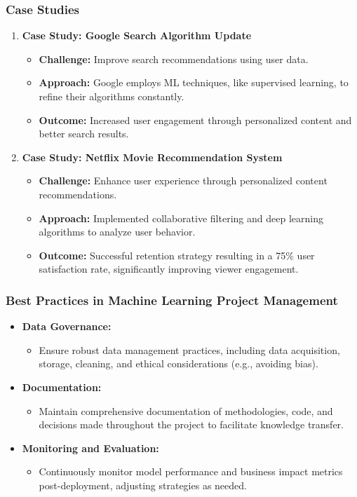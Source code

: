 \documentclass[aspectratio=169]{beamer}
\begin{document}
\begin{frame}[fragile]
    \frametitle{Case Studies}
    \begin{enumerate}
        \item \textbf{Case Study: Google Search Algorithm Update}
            \begin{itemize}
                \item \textbf{Challenge:} Improve search recommendations using user data.
                \item \textbf{Approach:} Google employs ML techniques, like supervised learning, to refine their algorithms constantly.
                \item \textbf{Outcome:} Increased user engagement through personalized content and better search results.
            \end{itemize}
        \item \textbf{Case Study: Netflix Movie Recommendation System}
            \begin{itemize}
                \item \textbf{Challenge:} Enhance user experience through personalized content recommendations.
                \item \textbf{Approach:} Implemented collaborative filtering and deep learning algorithms to analyze user behavior.
                \item \textbf{Outcome:} Successful retention strategy resulting in a 75\% user satisfaction rate, significantly improving viewer engagement.
            \end{itemize}
    \end{enumerate}
\end{frame}

\begin{frame}[fragile]
    \frametitle{Best Practices in Machine Learning Project Management}
    \begin{itemize}
        \item \textbf{Data Governance:} 
            \begin{itemize}
                \item Ensure robust data management practices, including data acquisition, storage, cleaning, and ethical considerations (e.g., avoiding bias).
            \end{itemize}
        \item \textbf{Documentation:} 
            \begin{itemize}
                \item Maintain comprehensive documentation of methodologies, code, and decisions made throughout the project to facilitate knowledge transfer.
            \end{itemize}
        \item \textbf{Monitoring and Evaluation:} 
            \begin{itemize}
                \item Continuously monitor model performance and business impact metrics post-deployment, adjusting strategies as needed.
            \end{itemize}
    \end{itemize}
\end{frame}
\end{document}
